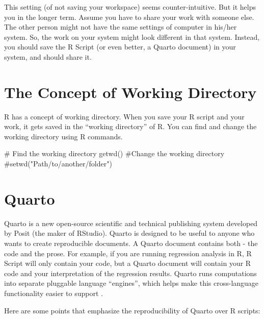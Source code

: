 \documentclass[
  letterpaper,
  paper =a4,
  twoside,
  openright,
  headsepline,
  footsepline,
  listof = totocnumbered,
  chapterprefix = true,
  firstiscover,
  parskip = full*]{scrbook}
\newenvironment{Shaded}{\begin{snugshade}}{\end{snugshade}}
\newcommand{\CommentTok}[1]{\textcolor[rgb]{0.37,0.37,0.37}{#1}}
\newcommand{\FunctionTok}[1]{\textcolor[rgb]{0.28,0.35,0.67}{#1}}
\newcommand{\NormalTok}[1]{\textcolor[rgb]{0.00,0.23,0.31}{#1}}
\begin{document}
This setting (of not saving your workspace) seems counter-intuitive. But
it helps you in the longer term. Assume you have to share your work with
someone else. The other person might not have the same settings of
computer in his/her system. So, the work on your system might look
different in that system. Instead, you should save the R Script (or even
better, a Quarto document) in your system, and should share it.

\section{The Concept of Working
Directory}\label{the-concept-of-working-directory}

R has a concept of working directory. When you save your R script and
your work, it gets saved in the ``working directory'' of R. You can find
and change the working directory using R commands.

\begin{Shaded}
\begin{Highlighting}[]
\CommentTok{\# Find the working directory}
\FunctionTok{getwd}\NormalTok{()}
\CommentTok{\#Change the working directory}
\CommentTok{\#setwd("Path/to/another/folder")}
\end{Highlighting}
\end{Shaded}

\section{Quarto}\label{quarto}

Quarto is a new open-source scientific and technical publishing system
developed by Posit (the maker of RStudio). Quarto is designed to be
useful to anyone who wants to create reproducible documents. A Quarto
document contains both - the code and the prose. For example, if you are
running regression analysis in R, R Script will only contain your code,
but a Quarto document will contain your R code and your interpretation
of the regression results. Quarto runs computations into separate
pluggable language ``engines'', which helps make this cross-language
functionality easier to support .

Here are some points that emphasize the reproducibility of Quarto over R
scripts:
\end{document}
